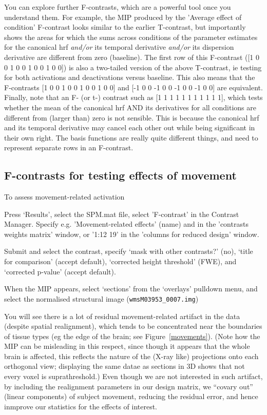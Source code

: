 You can explore further F-contrasts, which are a powerful tool once you understand them. For example, the MIP produced by the 'Average effect of condition' F-contrast looks similar to the earlier T-contrast, but importantly shows the areas for which the sums across conditions of the parameter estimates for the canonical hrf {\em and/or} its temporal derivative {\em and/or} its dispersion derivative are different from zero (baseline). The first row of this F-contrast ([1 0 0 1 0 0 1 0 0 1 0 0]) is also a two-tailed version of the above T-contrast, ie testing for both activations and deactivations versus baseline. This also means that the F-contrasts [1 0 0 1 0 0 1 0 0 1 0 0] and [-1 0 0 -1 0 0 -1 0 0 -1 0 0] are equivalent. Finally, note that an F- (or t-) contrast such as [1 1 1 1 1 1 1 1 1 1 1], which tests whether the mean of the canonical hrf AND its derivatives for all conditions are different from (larger than) zero is not sensible. This is because the canonical hrf and its temporal derivative may cancel each other out while being significant in their own right. The basis functions are really quite different things, and need to represent separate rows in an F-contrast. 


\subsection{F-contrasts for testing effects of movement}

To assess movement-related activation
\bi
\item{Press `Results', select the SPM.mat file, select 'F-contrast' in the Contrast Manager. Specify e.g. 'Movement-related effects' (name) and 
in the 'contrasts weights matrix' window, or '1:12 19' in the 'columns for reduced design' window.} 
\item{
Submit and select the contrast, specify `mask with other contrasts?' (no), `title for comparison' (accept default), `corrected height threshold' (FWE), and `corrected p-value' (accept default).}
 \item{When the MIP appears, select `sections' from the `overlays' pulldown
 menu, and select the normalised structural image (\verb!wmsM03953_0007.img!)}
 \ei

You will see there is a lot of residual movement-related artifact in the data (despite spatial realignment), which tends to be concentrated near the boundaries of tissue types (eg the edge of the brain; see Figure~\ref{movements}). (Note how the MIP can be misleading in this respect, since though it appears that the whole brain is affected, this reflects the nature of the (X-ray like) projections onto each orthogonal view; displaying the same datae as sections in 3D shows that not every voxel is suprathreshold.)  Even though we are not interested in such artifact, by including the realignment parameters in our design matrix, we ``covary out'' (linear components) of subject movement, reducing the residual error, and hence inmprove our statistics for the effects of interest.

